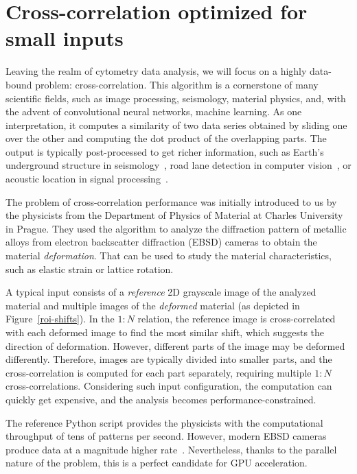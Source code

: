 \section{Cross-correlation optimized for small inputs}
\label{sec:cross-correlation}

Leaving the realm of cytometry data analysis, we will focus on a highly data-bound problem: cross-correlation. This algorithm is a cornerstone of many scientific fields, such as image processing, seismology, material physics, and, with the advent of convolutional neural networks, machine learning. As one interpretation, it computes a similarity of two data series obtained by sliding one over the other and computing the dot product of the overlapping parts. The output is typically post-processed to get richer information, such as Earth's underground structure in seismology~\cite{zhou2021high}, road lane detection in computer vision~\cite{fan2018real}, or acoustic location in signal processing~\cite{belloch2015performance}.

The problem of cross-correlation performance was initially introduced to us by the physicists from the Department of Physics of Material at Charles University in Prague. They used the algorithm to analyze the diffraction pattern of metallic alloys from electron backscatter diffraction (EBSD) cameras to obtain the material \emph{deformation}. That can be used to study the material characteristics, such as elastic strain or lattice rotation.

A typical input consists of a \emph{reference} 2D grayscale image of the analyzed material and multiple images of the \emph{deformed} material (as depicted in Figure~\ref{roi-shifts}). In the $1:N$ relation, the reference image is cross-correlated with each deformed image to find the most similar shift, which suggests the direction of deformation. However, different parts of the image may be deformed differently. Therefore, images are typically divided into smaller parts, and the cross-correlation is computed for each part separately, requiring multiple $1:N$ cross-correlations. Considering such input configuration, the computation can quickly get expensive, and the analysis becomes performance-constrained.

The reference Python script provides the physicists with the computational throughput of tens of patterns per second. However, modern EBSD cameras produce data at a magnitude higher rate~\cite{bali2021zpracovani}. Nevertheless, thanks to the parallel nature of the problem, this is a perfect candidate for GPU acceleration.

